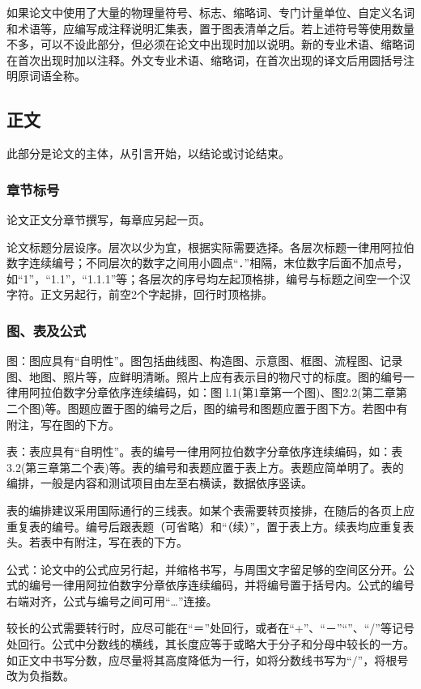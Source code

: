 \documentclass[a4paper,12pt,oneside,openany]{book}
\begin{document}
\begin{CJK}{UTF8}{hei}
如果论文中使用了大量的物理量符号、标志、缩略词、专门计量单位、自定义名词和术语等，应编写成注释说明汇集表，置于图表清单之后。若上述符号等使用数量不多，可以不设此部分，但必须在论文中出现时加以说明。新的专业术语、缩略词在首次出现时加以注释。外文专业术语、缩略词，在首次出现的译文后用圆括号注明原词语全称。


\subsection{正文}

此部分是论文的主体，从引言开始，以结论或讨论结束。


\subsubsection{章节标号}

论文正文分章节撰写，每章应另起一页。

论文标题分层设序。层次以少为宜，根据实际需要选择。各层次标题一律用阿拉伯数字连续编号；不同层次的数字之间用小圆点“．”相隔，末位数字后面不加点号，如“1”，“1.1”，“1.1.1”等；各层次的序号均左起顶格排，编号与标题之间空一个汉字符。正文另起行，前空2个字起排，回行时顶格排。 


\subsubsection{图、表及公式}

图：图应具有“自明性”。图包括曲线图、构造图、示意图、框图、流程图、记录图、地图、照片等，应鲜明清晰。照片上应有表示目的物尺寸的标度。图的编号一律用阿拉伯数字分章依序连续编码，如：图
l.1(第1章第一个图)、图2.2(第二章第二个图)等。图题应置于图的编号之后，图的编号和图题应置于图下方。若图中有附注，写在图的下方。

表：表应具有“自明性”。表的编号一律用阿拉伯数字分章依序连续编码，如：表 3.2(第三章第二个表)等。表的编号和表题应置于表上方。表题应简单明了。表的编排，一般是内容和测试项目由左至右横读，数据依序竖读。

表的编排建议采用国际通行的三线表。如某个表需要转页接排，在随后的各页上应重复表的编号。编号后跟表题（可省略）和“（续）”，置于表上方。续表均应重复表头。若表中有附注，写在表的下方。

公式：论文中的公式应另行起，并缩格书写，与周围文字留足够的空间区分开。公式的编号一律用阿拉伯数字分章依序连续编码，并将编号置于括号内。公式的编号右端对齐，公式与编号之间可用“…”连接。

较长的公式需要转行时，应尽可能在“＝”处回行，或者在“+”、“－”“”、“/”等记号处回行。公式中分数线的横线，其长度应等于或略大于分子和分母中较长的一方。如正文中书写分数，应尽量将其高度降低为一行，如将分数线书写为“/”，将根号改为负指数。 



\end{CJK}
\end{document}
